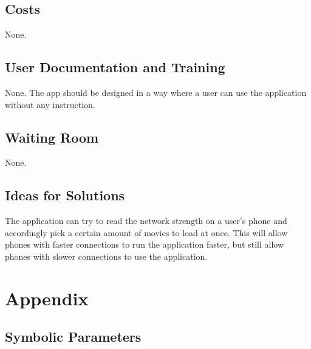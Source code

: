 \documentclass[12pt, titlepage]{article}
\begin{document}
\subsection{Costs}

None.
\subsection{User Documentation and Training}

None. The app should be designed in a way where a user can use the application without any instruction.

\subsection{Waiting Room}

None.

\subsection{Ideas for Solutions}

The application can try to read the network strength on a user’s phone and accordingly pick a certain amount of movies to load at once. This will allow phones with faster connections to run the application faster, but still allow phones with slower connections to use the application.





\newpage

\section{Appendix}



\subsection{Symbolic Parameters}
\end{document}
